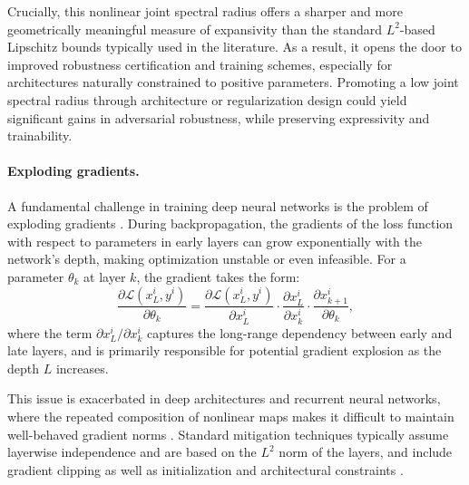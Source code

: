\documentclass{article}
\begin{document}
Crucially, this nonlinear joint spectral radius offers a sharper and more geometrically meaningful measure of expansivity than the standard $L^2$-based Lipschitz bounds typically used in the literature. As a result, it opens the door to improved robustness certification and training schemes, especially for architectures naturally constrained to positive parameters. Promoting a low joint spectral radius through architecture or regularization design could yield significant gains in adversarial robustness, while preserving expressivity and trainability.






\paragraph{Exploding gradients.}
A fundamental challenge in training deep neural networks is the problem of exploding gradients \cite{bengio1994learning, pascanu2013difficulty}. During backpropagation, the gradients of the loss function with respect to parameters in early layers can grow exponentially with the network's depth, making optimization unstable or even infeasible. For a parameter $\theta_k$ at layer $k$, the gradient takes the form:
\begin{equation}
    \frac{\partial \mathcal{L}(x_L^i, y^i)}{\partial \theta_k} = \frac{\partial \mathcal{L}(x_L^i, y^i)}{\partial x_L^i} \cdot \frac{\partial x_L^i}{\partial x_k^i} \cdot \frac{\partial x_{k+1}^i}{\partial \theta_k},
\end{equation}
where the term $\partial x_L^i / \partial x_k^i$ captures the long-range dependency between early and late layers, and is primarily responsible for potential gradient explosion as the depth $L$ increases.

This issue is exacerbated in deep architectures and recurrent neural networks, where the repeated composition of nonlinear maps makes it difficult to maintain well-behaved gradient norms \cite{pascanu2013difficulty, hochreiter1998vanishing}. Standard mitigation techniques typically assume layerwise independence and are based on the $L^2$ norm of the layers, and include gradient clipping as well as initialization and architectural constraints \cite{glorot2010understanding, arjovsky2016unitary, zhang2019fixup}.
\end{document}
